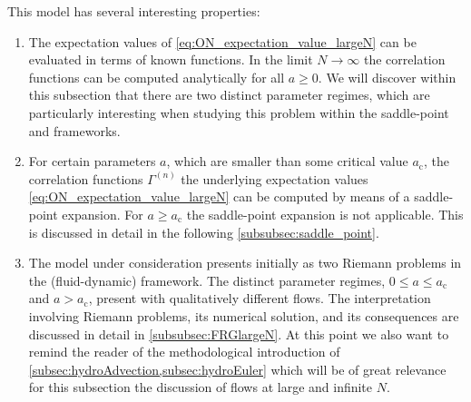This model has several interesting properties:
\begin{enumerate}
	\item	The expectation values of \cref{eq:ON_expectation_value_largeN} can be evaluated in terms of known functions.
	In the limit ${N \rightarrow \infty}$ the \ipi{} correlation functions can be computed analytically for all $a\geq0$.
	We will discover within this subsection that there are two distinct parameter regimes, which are particularly interesting when studying this problem within the saddle-point and \frg{} frameworks.
	
	\item	For certain parameters $a$, which are smaller than some critical value $a_\mathrm{c}$, the \ipi{} correlation functions $\Gamma^{(n)}$ \dash{} the underlying expectation values \eqref{eq:ON_expectation_value_largeN} \dash{} can be computed by means of a saddle-point expansion.
	For $a \geq a_\mathrm{c}$ the saddle-point expansion is not applicable.
	This is discussed in detail in the following \cref{subsubsec:saddle_point}.
	
	\item	The model under consideration presents initially as two Riemann problems in the \frg{}  (fluid-dynamic) framework.
	The distinct parameter regimes, ${0 \leq a \leq a_\mathrm{c}}$ and $a > a_\mathrm{c}$, present with qualitatively different \frg{} flows.
	The interpretation involving Riemann problems, its numerical solution, and its consequences are discussed in detail in \cref{subsubsec:FRGlargeN}.
	At this point we also want to remind the reader of the methodological introduction of \cref{subsec:hydroAdvection,subsec:hydroEuler} which will be of great relevance for this subsection \dash{} the discussion of \frg{} flows at large and infinite $N$.
\end{enumerate}\bigskip

